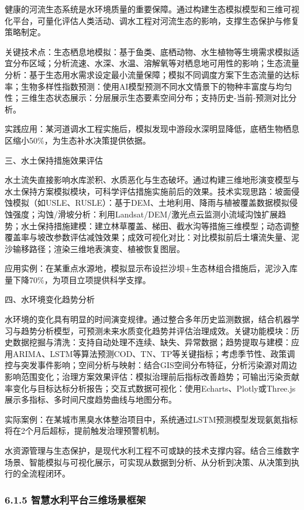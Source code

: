 健康的河流生态系统是水环境质量的重要保障。通过构建生态模拟模型和三维可视化平台，可量化评估人类活动、调水工程对河流生态的影响，支撑生态保护与修复策略制定。

关键技术点：生态栖息地模拟：基于鱼类、底栖动物、水生植物等生境需求模拟适宜分布区域；分析流速、水深、水温、溶解氧等对栖息地可用性的影响；生态流量分析：基于生态用水需求设定最小流量保障；模拟不同调度方案下生态流量的达标率；生物多样性指数预测：使用AI模型预测不同水文情景下的物种丰富度与均匀性；三维生态状态展示：分层展示生态要素空间分布；支持历史-当前-预测对比分析。

实践应用：某河道调水工程实施后，模拟发现中游段水深明显降低，底栖生物栖息区缩小50\%，为生态补水决策提供依据。

三、水土保持措施效果评估

水土流失直接影响水库淤积、水质恶化与生态破坏。通过构建三维地形演变模型与水土保持方案模拟模块，可科学评估措施实施前后的效果。技术实现思路：坡面侵蚀模拟（如USLE、RUSLE）：基于DEM、土地利用、降雨与植被覆盖数据模拟侵蚀强度；沟蚀/滑坡分析：利用Landsat/DEM/激光点云监测小流域沟蚀扩展趋势；水土保持措施建模：建立林草覆盖、梯田、截水沟等措施三维模型；动态调整覆盖率与坡改参数评估减蚀效果；成效可视化对比：对比模拟前后土壤流失量、泥沙输移路径；渲染三维地表演变、植被恢复图层。

应用实例：在某重点水源地，模拟显示布设拦沙坝+生态林组合措施后，泥沙入库量下降70\%，为项目立项提供科学支撑。

四、水环境变化趋势分析

水环境的变化具有明显的时间演变规律。通过整合多年历史监测数据，结合机器学习与趋势分析模型，可预测未来水质变化趋势并评估治理成效。关键功能模块：历史数据挖掘与清洗：支持自动处理不连续、缺失、异常数据；趋势提取与建模：应用ARIMA、LSTM等算法预测COD、TN、TP等关键指标；考虑季节性、政策调控与突发事件影响；空间分析与映射：结合GIS空间分布特征，分析污染源对周边影响范围变化；治理方案效果评估：模拟治理前后指标改善趋势；可输出污染贡献率变化与目标达标分析报告；交互式数据可视化：使用Echarts、Plotly或Three.js展示多指标、多时间尺度趋势曲线与地图分布。

实际案例：在某城市黑臭水体整治项目中，系统通过LSTM预测模型发现氨氮指标将在2个月后超标，提前触发治理预警机制。

水资源管理与生态保护，是现代水利工程不可或缺的技术支撑内容。结合三维数字场景、智能模拟与可视化展示，可实现从数据到分析、从分析到决策、从决策到执行的全流程闭环。

\hypertarget{ux667aux6167ux6c34ux5229ux5e73ux53f0ux4e09ux7ef4ux573aux666fux6846ux67b6}{%
\subsubsection{6.1.5 智慧水利平台三维场景框架}\label{ux667aux6167ux6c34ux5229ux5e73ux53f0ux4e09ux7ef4ux573aux666fux6846ux67b6}}

